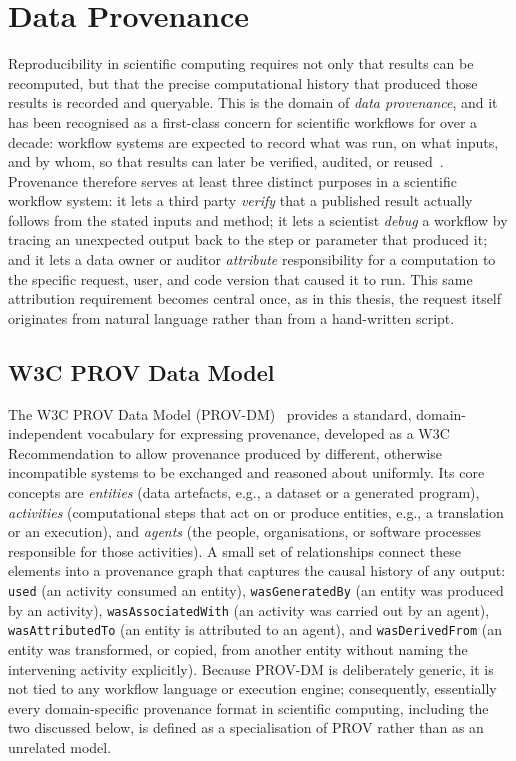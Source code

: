 \section{Data Provenance}\label{s:provenance}

Reproducibility in scientific computing requires not only that results can be
recomputed, but that the precise computational history that produced those
results is recorded and queryable. This is the domain of \emph{data
provenance}, and it has been recognised as a first-class concern for
scientific workflows for over a decade: workflow systems are expected to record
what was run, on what inputs, and by whom, so that results can later be
verified, audited, or reused~\cite{davidson2008provenance}. Provenance
therefore serves at least three distinct purposes in a scientific workflow
system: it lets a third party \emph{verify} that a published result actually
follows from the stated inputs and method; it lets a scientist \emph{debug} a
workflow by tracing an unexpected output back to the step or parameter that
produced it; and it lets a data owner or auditor \emph{attribute}
responsibility for a computation to the specific request, user, and code
version that caused it to run. This same attribution requirement becomes
central once, as in this thesis, the request itself originates from natural
language rather than from a hand-written script.

\subsection{W3C PROV Data Model}

The W3C PROV Data Model (PROV-DM)~\cite{moreau2013provdm} provides a standard,
domain-independent vocabulary for expressing provenance, developed as a W3C
Recommendation to allow provenance produced by different, otherwise
incompatible systems to be exchanged and reasoned about uniformly. Its core
concepts are \emph{entities} (data artefacts, e.g., a dataset or a generated
program), \emph{activities} (computational steps that act on or produce
entities, e.g., a translation or an execution), and \emph{agents} (the
people, organisations, or software processes responsible for those
activities). A small set of relationships connect these elements into a
provenance graph that captures the causal history of any output:
\texttt{used} (an activity consumed an entity), \texttt{wasGeneratedBy} (an
entity was produced by an activity), \texttt{wasAssociatedWith} (an activity
was carried out by an agent), \texttt{wasAttributedTo} (an entity is
attributed to an agent), and \texttt{wasDerivedFrom} (an entity was
transformed, or copied, from another entity without naming the intervening
activity explicitly). Because PROV-DM is deliberately generic, it is not
tied to any workflow language or execution engine; consequently, essentially
every domain-specific provenance format in scientific computing, including
the two discussed below, is defined as a specialisation of PROV rather than
as an unrelated model.

